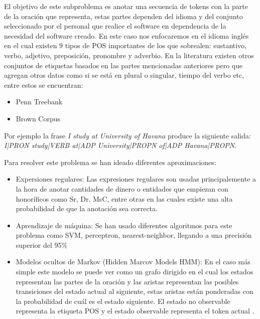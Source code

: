 \documentclass[runningheads]{llncs}
\begin{document}
El objetivo de este subproblema es anotar una secuencia de tokens con la parte de la oración que representa, estas partes dependen del idioma y del conjunto seleccionado por el personal que realice el software en dependencia de la necesidad del software creado. En este caso nos enfocaremos en el idioma inglés en el cual existen 9 tipos de POS importantes de los que sobrealen: sustantivo, verbo, adjetivo, preposición, pronombre y adverbio. En la literatura existen otros conjuntos de etiquetas basados en las partes mencionadas anteriores pero que agregan otros datos como si se está en plural o singular, tiempo del verbo etc, entre estos se encuentran:

\begin{itemize}
\item Penn Treebank \cite{pennpostag}
\item Brown Corpus \cite{brownpostag}
\end{itemize}

Por ejemplo la frase \emph{I study at University of Havana} produce la siguiente salida: \emph{I|PRON study|VERB at|ADP University|PROPN of|ADP Havana|PROPN}.

Para resolver este problema se han ideado diferentes aproximaciones:

\begin{itemize}

\item Expersiones regulares: Las expresiones regulares son usadas principalemente a la hora de anotar cantidades de dinero o entidades que empiezan con honoríficos como Sr, Dr, MsC, entre otras en las cuales existe una alta probabilidad de que la anotación sea correcta.

\item Aprendizaje de máquina: Se han usado diferentes algoritmos para este problema como SVM, perceptron, nearest-neighbor, llegando a una precisión superior del 95\% \cite{postag}

\item Modelos ocultos de Markov (Hidden Marcov Models HMM): En el caso más simple este modelo se puede ver como un grafo dirigido en el cual los estados representan las partes de la oración y las aristas representan las posibles transiciones del estado actual al siguiente, estas aristas están ponderadas con la probabilidad de cuál es el estado siguiente. El estado no observable representa la etiqueta POS y el estado observable representa el token actual \cite{hmm}.

\end{itemize}
\end{document}
